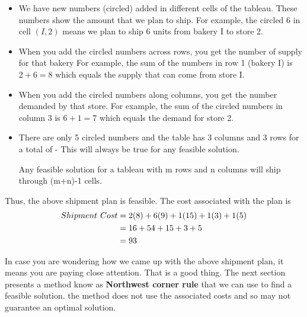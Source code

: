 \documentclass[
  letterpaper,
  DIV=11,
  numbers=noendperiod]{scrreprt}
\newenvironment{Shaded}{\begin{snugshade}}{\end{snugshade}}
\newcommand{\DataTypeTok}[1]{\textcolor[rgb]{0.68,0.00,0.00}{#1}}
\newcommand{\ErrorTok}[1]{\textcolor[rgb]{0.68,0.00,0.00}{#1}}
\newcommand{\KeywordTok}[1]{\textcolor[rgb]{0.00,0.23,0.31}{#1}}
\begin{document}
\begin{itemize}
\item
  We have new numbers (circled) added in different cells of the tableau.
  These numbers show the amount that we plan to ship. For example, the
  circled 6 in cell \((I,2)\) means we plan to ship 6 units from bakery
  I to store 2.
\item
  When you add the circled numbers across rows, you get the number of
  supply for that bakery For example, the sum of the numbers in row 1
  (bakery I) is \(2+6=8\) which equals the supply that can come from
  store I.
\item
  When you add the circled numbers along columns, you get the number
  demanded by that store. For example, the sum of the circled numbers in
  column 3 is \(6+1=7\) which equals the demand for store 2.
\item
  There are only 5 circled numbers and the table has 3 columns and 3
  rows for a total of - This will always be true for any feasible
  solution.

\begin{Shaded}
\begin{Highlighting}[]
\DataTypeTok{Any} \DataTypeTok{feasible} \DataTypeTok{solution} \DataTypeTok{for} \DataTypeTok{a} \DataTypeTok{tableau} \DataTypeTok{with} \DataTypeTok{m} \DataTypeTok{rows} \DataTypeTok{and} \DataTypeTok{n} \DataTypeTok{columns} \DataTypeTok{will} \DataTypeTok{ship} 
\DataTypeTok{through} \ErrorTok{(}\DataTypeTok{m}\ErrorTok{+}\DataTypeTok{n}\ErrorTok{)}\DataTypeTok{{-}1} \DataTypeTok{cells}\KeywordTok{.} 
\end{Highlighting}
\end{Shaded}
\end{itemize}

Thus, the above shipment plan is feasible. The cost associated with the
plan is \begin{align}
Shipment \hspace{.05in}Cost&= 2(8)+6(9)+1(15)+1(3)+1(5)\\
&=16+54+15+3+5\\
&=93
\end{align}

In case you are wondering how we came up with the above shipment plan,
it means you are paying close attention. That is a good thing. The next
section presents a method know as \textbf{Northwest corner rule} that we
can use to find a feasible solution. the method does not use the
associated costs and so may not guarantee an optimal solution.
\end{document}

